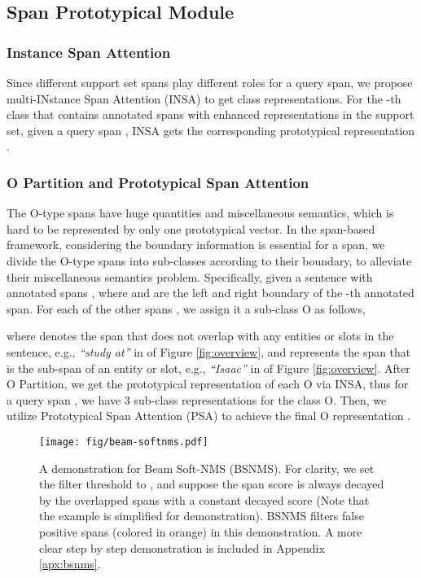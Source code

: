 \documentclass[11pt]{article}
\begin{document}
\subsection{Span Prototypical Module}
\subsubsection{Instance Span Attention}
Since different support set spans play different roles for a query span, we propose multi-INstance Span Attention (INSA) to get class representations.
For the -th class that contains  annotated spans with enhanced representations  in the support set,
given a query span ,  INSA gets the corresponding prototypical representation .

\subsubsection{O Partition and Prototypical Span Attention}
The O-type spans have huge quantities and miscellaneous semantics, which is hard to be represented by only one prototypical vector. In the span-based framework, considering the boundary information is essential for a span, we divide the O-type spans into  sub-classes according to their boundary, to alleviate their miscellaneous semantics problem.
Specifically, given a sentence with  annotated spans , where  and  are the left and right boundary of the -th annotated span.
For each of the other spans  , we assign it a sub-class O as follows,

where  denotes the span that does not overlap with any entities or slots in the sentence, e.g., \textit{``study at''} in  of Figure \ref{fig:overview},
and  represents the span that is the sub-span of an entity or slot, e.g., \textit{``Isaac''} in  of Figure  \ref{fig:overview}. 
After O Partition, we get the prototypical representation of each O via INSA, thus for a query span , we have 3 sub-class representations  for the class O.
Then, we utilize Prototypical Span Attention (PSA) to achieve the final O representation 
.
\begin{figure}[t]
    \centering
    \texttt{[image: fig/beam-softnms.pdf]}
    \caption{A demonstration for Beam Soft-NMS (BSNMS). 
    For clarity, we set the filter threshold  to , and suppose the span score is always decayed by the overlapped spans with a constant decayed score   (Note that the example is simplified for demonstration). BSNMS filters false positive spans (colored in orange) in this demonstration. A more clear step by step demonstration is included in Appendix \ref{apx:bsnms}.
    }
    \label{fig:beam-softnms}
\end{figure}
\end{document}
